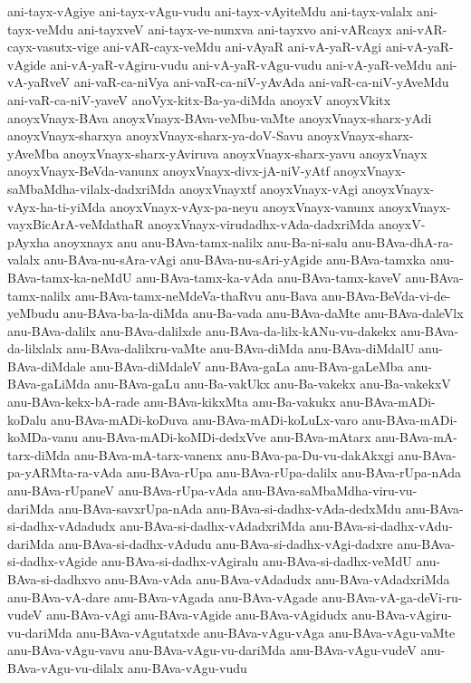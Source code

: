 {ani-tayx-vAgiye
ani-tayx-vAgu-vudu
ani-tayx-vAyiteMdu
ani-tayx-valalx
ani-tayx-veMdu
ani-tayxveV
ani-tayx-ve-nunxva
ani-tayxvo
ani-vARcayx
ani-vAR-cayx-vasutx-vige
ani-vAR-cayx-veMdu
ani-vAyaR
ani-vA-yaR-vAgi
ani-vA-yaR-vAgide
ani-vA-yaR-vAgiru-vudu
ani-vA-yaR-vAgu-vudu
ani-vA-yaR-veMdu
ani-vA-yaRveV
ani-vaR-ca-niVya
ani-vaR-ca-niV-yAvAda
ani-vaR-ca-niV-yAveMdu
ani-vaR-ca-niV-yaveV
anoVyx-kitx-Ba-ya-diMda
anoyxV
anoyxVkitx
anoyxVnayx-BAva
anoyxVnayx-BAva-veMbu-vaMte
anoyxVnayx-sharx-yAdi
anoyxVnayx-sharxya
anoyxVnayx-sharx-ya-doV-Savu
anoyxVnayx-sharx-yAveMba
anoyxVnayx-sharx-yAviruva
anoyxVnayx-sharx-yavu
anoyxVnayx
anoyxVnayx-BeVda-vanunx
anoyxVnayx-divx-jA-niV-yAtf
anoyxVnayx-saMbaMdha-vilalx-dadxriMda
anoyxVnayxtf
anoyxVnayx-vAgi
anoyxVnayx-vAyx-ha-ti-yiMda
anoyxVnayx-vAyx-pa-neyu
anoyxVnayx-vanunx
anoyxVnayx-vayxBicArA-veMdathaR
anoyxVnayx-virudadhx-vAda-dadxriMda
anoyxV-pAyxha
anoyxnayx
anu
anu-BAva-tamx-nalilx
anu-Ba-ni-salu
anu-BAva-dhA-ra-valalx
anu-BAva-nu-sAra-vAgi
anu-BAva-nu-sAri-yAgide
anu-BAva-tamxka
anu-BAva-tamx-ka-neMdU
anu-BAva-tamx-ka-vAda
anu-BAva-tamx-kaveV
anu-BAva-tamx-nalilx
anu-BAva-tamx-neMdeVa-thaRvu
anu-Bava
anu-BAva-BeVda-vi-de-yeMbudu
anu-BAva-ba-la-diMda
anu-Ba-vada
anu-BAva-daMte
anu-BAva-daleVlx
anu-BAva-dalilx
anu-BAva-dalilxde
anu-BAva-da-lilx-kANu-vu-dakekx
anu-BAva-da-lilxlalx
anu-BAva-dalilxru-vaMte
anu-BAva-diMda
anu-BAva-diMdalU
anu-BAva-diMdale
anu-BAva-diMdaleV
anu-BAva-gaLa
anu-BAva-gaLeMba
anu-BAva-gaLiMda
anu-BAva-gaLu
anu-Ba-vakUkx
anu-Ba-vakekx
anu-Ba-vakekxV
anu-BAva-kekx-bA-rade
anu-BAva-kikxMta
anu-Ba-vakukx
anu-BAva-mADi-koDalu
anu-BAva-mADi-koDuva
anu-BAva-mADi-koLuLx-varo
anu-BAva-mADi-koMDa-vanu
anu-BAva-mADi-koMDi-dedxVve
anu-BAva-mAtarx
anu-BAva-mA-tarx-diMda
anu-BAva-mA-tarx-vanenx
anu-BAva-pa-Du-vu-dakAkxgi
anu-BAva-pa-yARMta-ra-vAda
anu-BAva-rUpa
anu-BAva-rUpa-dalilx
anu-BAva-rUpa-nAda
anu-BAva-rUpaneV
anu-BAva-rUpa-vAda
anu-BAva-saMbaMdha-viru-vu-dariMda
anu-BAva-savxrUpa-nAda
anu-BAva-si-dadhx-vAda-dedxMdu
anu-BAva-si-dadhx-vAdadudx
anu-BAva-si-dadhx-vAdadxriMda
anu-BAva-si-dadhx-vAdu-dariMda
anu-BAva-si-dadhx-vAdudu
anu-BAva-si-dadhx-vAgi-dadxre
anu-BAva-si-dadhx-vAgide
anu-BAva-si-dadhx-vAgiralu
anu-BAva-si-dadhx-veMdU
anu-BAva-si-dadhxvo
anu-BAva-vAda
anu-BAva-vAdadudx
anu-BAva-vAdadxriMda
anu-BAva-vA-dare
anu-BAva-vAgada
anu-BAva-vAgade
anu-BAva-vA-ga-deVi-ru-vudeV
anu-BAva-vAgi
anu-BAva-vAgide
anu-BAva-vAgidudx
anu-BAva-vAgiru-vu-dariMda
anu-BAva-vAgutatxde
anu-BAva-vAgu-vAga
anu-BAva-vAgu-vaMte
anu-BAva-vAgu-vavu
anu-BAva-vAgu-vu-dariMda
anu-BAva-vAgu-vudeV
anu-BAva-vAgu-vu-dilalx
anu-BAva-vAgu-vudu
}
